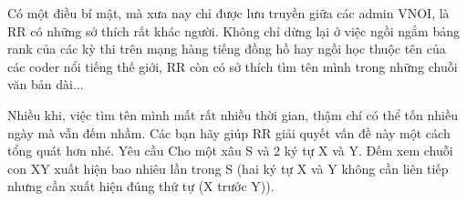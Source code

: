 Có một điều bí mật, mà xưa nay chỉ được lưu truyền giữa các admin VNOI, là RR có những sở thích rất khác người. Không chỉ dừng lại ở việc ngồi ngắm bảng rank của các kỳ thi trên mạng hàng tiếng đồng hồ hay ngồi học thuộc tên của các coder nổi tiếng thế giới, RR còn có sở thích tìm tên mình trong những chuỗi văn bản dài...  

   Nhiều khi, việc tìm tên mình mất rất nhiều thời gian, thậm chí có thể tốn nhiều ngày mà vẫn đếm nhầm. Các bạn hãy giúp RR giải quyết vấn đề này một cách tổng quát hơn nhé.
   Yêu cầu  
Cho một xâu S và 2 ký tự X và Y. Đếm xem chuỗi con XY xuất hiện bao nhiêu lần trong S (hai ký tự X và Y không cần liên tiếp nhưng cần xuất hiện đúng thứ tự (X trước Y)).